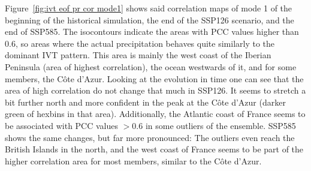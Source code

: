 Figure~\ref{fig:ivt eof pr cor mode1} shows said correlation maps of mode 1 of the beginning of the historical simulation, the end of the SSP126 scenario, and the end of SSP585. 
The isocontours indicate the areas with PCC values higher than $0.6$, so areas where the actual precipitation behaves quite similarly to the dominant IVT pattern. 
This area is mainly the west coast of the Iberian Peninsula (area of highest correlation), the ocean westwards of it, and for some members, the Côte d'Azur. 
Looking at the evolution in time one can see that the area of high correlation do not change that much in SSP126. 
It seems to stretch a bit further north and more confident in the peak at the Côte d'Azur (darker green of hexbins in that area). 
Additionally, the Atlantic coast of France seems to be associated with PCC values $>0.6$ in some outliers of the ensemble. 
SSP585 shows the same changes, but far more pronounced: The outliers even reach the British Islands in the north, and the west coast of France seems to be part of the higher correlation area for most members, similar to the Côte d'Azur.

